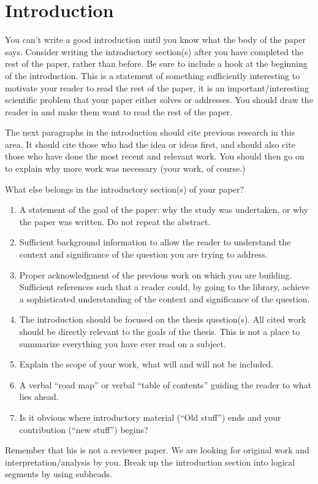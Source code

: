 \chapter{Introduction}
You can't write a good introduction until you know what the body of the paper says. Consider writing the introductory section(s) after you have completed the rest of the paper, rather than before.
Be sure to include a hook at the beginning of the introduction. This is a statement of something sufficiently interesting to motivate your reader to read the rest of the paper, it is an important/interesting scientific problem that your paper either solves or addresses. You should draw the reader in and make them want to read the rest of the paper.

The next paragraphs in the introduction should cite previous research in this area. It should cite those who had the idea or ideas first, and should also cite those who have done the most recent and relevant work. You should then go on to explain why more work was necessary (your work, of course.) 
 
What else belongs in the introductory section(s) of your paper? 
\begin{enumerate}
 \item A statement of the goal of the paper: why the study was undertaken, or why the paper was written. Do not repeat the abstract.
 \item Sufficient background information to allow the reader to understand the context and significance of the question you are trying to address.
 \item Proper acknowledgment of the previous work on which you are building. Sufficient references such that a reader could, by going to the library, achieve a sophisticated understanding of the context and significance of the question.
 \item The introduction should be focused on the thesis question(s). All cited work should be directly relevant to the goals of the thesis. This is not a place to summarize everything you have ever read on a subject.
 \item Explain the scope of your work, what will and will not be included.
 \item A verbal ``road map'' or verbal ``table of contents'' guiding the reader to what lies ahead.
 \item Is it obvious where introductory material (``Old stuff'') ends and your contribution (``new stuff'') begins?
\end{enumerate}
Remember that his is not a reviewer paper. We are looking for original work and interpretation/analysis by you. Break up the introduction section into logical segments by using subheads.
